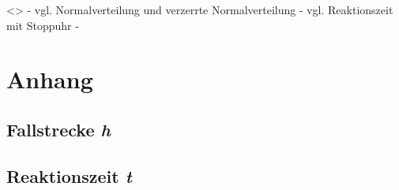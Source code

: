 \documentclass[a4paper,12pt]{article}
\begin{document}
<>
- vgl. Normalverteilung und verzerrte Normalverteilung
- vgl. Reaktionszeit mit Stoppuhr
- 

\newpage
\section{Anhang}
\subsection{Fallstrecke \textit{h}}
\label{AnahangFallstrecke}




\newpage
\subsection{Reaktionszeit \textit{t}}
\label{AnahangReaktionszeit}


\end{document}
